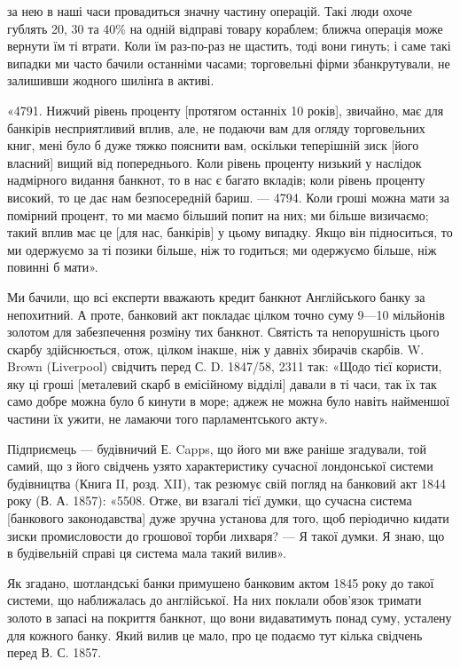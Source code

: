 \parcont{}  %
за нею в наші часи провадиться значну частину операцій. Такі люди охоче
гублять 20, 30 та 40\% на одній відправі товару кораблем; ближча операція
може вернути їм ті втрати. Коли їм раз-по-раз не щастить, тоді вони гинуть;
і саме такі випадки ми часто бачили останніми часами; торговельні фірми
збанкрутували, не залишивши жодного шилінґа в активі.

«4791. Нижчий рівень проценту [протягом останніх 10 років], звичайно,
має для банкірів несприятливий вплив, але, не подаючи вам для огляду торговельних
книг, мені було б дуже тяжко пояснити вам, оскільки теперішній
зиск [його власний] вищий від попереднього. Коли рівень проценту низький у
наслідок надмірного видання банкнот, то в нас є багато вкладів; коли рівень
проценту високий, то це дає нам безпосередній бариш. — 4794. Коли гроші можна
мати за помірний процент, то ми маємо більший попит на них; ми більше
визичаємо; такий вплив має це [для нас, банкірів] у цьому випадку. Якщо він
підноситься, то ми одержуємо за ті позики більше, ніж то годиться; ми одержуємо
більше, ніж повинні б мати».

Ми бачили, що всі експерти вважають кредит банкнот Англійського банку
за непохитний. А проте, банковий акт покладає цілком точно суму 9—10
мільйонів золотом для забезпечення розміну тих банкнот. Святість та непорушність
цього скарбу здійснюється, отож, цілком інакше, ніж у давніх збирачів
скарбів. W. Brown (Liverpool) свідчить перед С. D. 1847/58, 2311 так: «Щодо
тієї користи, яку ці гроші [металевий скарб в емісійному відділі] давали в ті
часи, так їх так само добре можна було б кинути в море; аджеж не можна було
навіть найменшої частини їх ужити, не ламаючи того парламентського акту».

Підприємець — будівничий Е. Capps, що його ми вже раніше згадували,
той самий, що з його свідчень узято характеристику сучасної лондонської системи
будівництва (Книга II, розд. XII), так резюмує свій погляд на банковий
акт 1844 року (В. А. 1857): «5508. Отже, ви взагалі тієї думки, що сучасна
система [банкового законодавства] дуже зручна установа для того, щоб періодично
кидати зиски промисловости до грошової торби лихваря? — Я такої думки.
Я знаю, що в будівельній справі ця система мала такий вилив».

Як згадано, шотландські банки примушено банковим актом 1845 року до
такої системи, що наближалась до англійської. На них поклали обов’язок тримати
золото в запасі на покриття банкнот, що вони видаватимуть понад суму,
усталену для кожного банку. Який вилив це мало, про це подаємо тут кілька
свідчень перед В. С. 1857.


